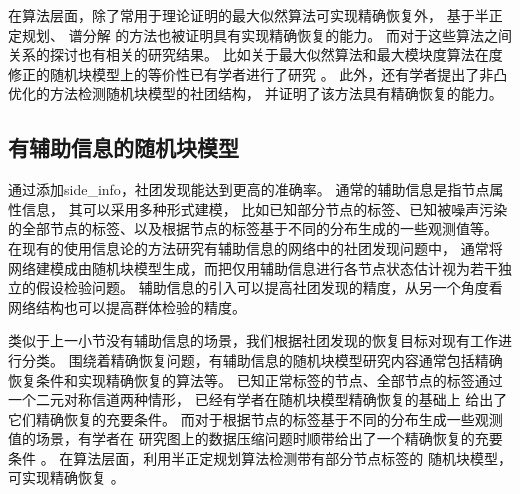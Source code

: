 
在算法层面，除了常用于理论证明的最大似然算法可实现精确恢复外，
基于半正定规划\cite{hajek2016achieving,amini2018semidefinite}、
谱分解\cite{Yun2014} 的方法也被证明具有实现精确恢复的能力。
而对于这些算法之间关系的探讨也有相关的研究结果。
比如关于最大似然算法和最大模块度算法在度修正的随机块模型上的等价性已有学者进行了研究 \cite{newman2016equivalence}。
此外，还有学者提出了非凸优化的方法检测随机块模型的社团结构，
并证明了该方法具有精确恢复的能力\cite{wang2021non}。




\subsection{有辅助信息的随机块模型}
通过添加\gls{side_info}，社团发现能达到更高的准确率。
通常的辅助信息是指节点属性信息\cite{he2019attribute}，
其可以采用多种形式建模，
比如已知部分节点的标签、已知被噪声污染的全部节点的标签、以及根据节点的标签基于不同的分布生成的一些观测值等\cite{saad2018community}。
在现有的使用信息论的方法研究有辅助信息的网络中的社团发现问题中，
通常将网络建模成由随机块模型生成，而把仅用辅助信息进行各节点状态估计视为若干独立的假设检验问题\cite{ahn2023testing}。
辅助信息的引入可以提高社团发现的精度，从另一个角度看网络结构也可以提高群体检验的精度。

类似于上一小节没有辅助信息的场景，我们根据社团发现的恢复目标对现有工作进行分类。
围绕着精确恢复问题，有辅助信息的随机块模型研究内容通常包括精确恢复条件和实现精确恢复的算法等。
已知正常标签的节点、全部节点的标签通过一个二元对称信道两种情形，
已经有学者在随机块模型精确恢复的基础上
给出了它们精确恢复的充要条件\cite{saad2018community, esmaeili2019community}。
而对于根据节点的标签基于不同的分布生成一些观测值的场景，有学者在
研究图上的数据压缩问题时顺带给出了一个精确恢复的充要条件 \cite{abbe17sideinfo}。
在算法层面，利用半正定规划算法检测带有部分节点标签的 随机块模型，
可实现精确恢复 \cite{esmaeili2019exact}。

